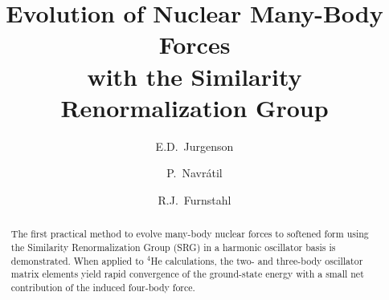 \documentclass[prc,twocolumn,showpacs,floatfix,nofootinbib,superscriptaddress]{revtex4}
\begin{document}

\title{Evolution of Nuclear Many-Body Forces \\
with the Similarity Renormalization Group}

\author{E.D.\ Jurgenson}%

\author{P.\ Navr\'atil}%

\author{R.J.\ Furnstahl}%


%
%


\begin{abstract}
The first practical method to evolve many-body nuclear forces to 
softened form using the Similarity Renormalization Group (SRG) in
a harmonic oscillator basis is demonstrated.  When applied to
$^4$He calculations, the two- and three-body oscillator matrix
elements yield rapid convergence of the ground-state energy with
a small net contribution of the induced four-body force. 
\end{abstract}
%
\smallskip
{}

\maketitle

\end{document}
